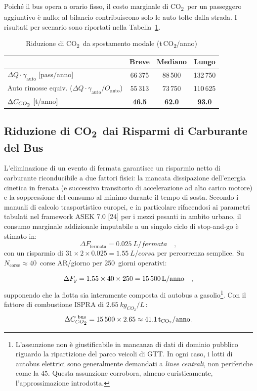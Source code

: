 \documentclass[conference]{IEEEtran}
\newcommand{\co}{CO\textsubscript{2}}
\begin{document}
Poiché il bus opera a orario fisso, il costo marginale di \co\
per un passeggero aggiuntivo è nullo; al bilancio contribuiscono
solo le auto tolte dalla strada. I risultati per scenario sono
riportati nella Tabella~\ref{tab:co2_shift}.

\begin{table}[htbp]
\caption{Riduzione di \co\ da spostamento modale (t\,\co/anno)}
\label{tab:co2_shift}
\centering
\renewcommand{\arraystretch}{1.15}
\begin{tabular}{@{}lccc@{}}
\toprule
 & Breve & Mediano & Lungo \\
\midrule
$\Delta Q \cdot \gamma_\text{auto}$ [pass/anno] & 66\,375 & 88\,500 & 132\,750 \\
Auto rimosse equiv. ($\Delta Q \cdot \gamma_\text{auto}/ O_{\text{auto}}$) & 55\,313 & 73\,750 & 110\,625 \\
$\Delta C_{\co}$ [t/anno] & \textbf{46.5} & \textbf{62.0} & \textbf{93.0} \\
\bottomrule
\end{tabular}
\end{table}

\subsection{Riduzione di \co\ dai Risparmi di Carburante del Bus}

L'eliminazione di un evento di fermata garantisce un risparmio netto di carburante riconducibile a due fattori fisici: la mancata dissipazione dell'energia cinetica in frenata (e successivo transitorio di accelerazione ad alto carico motore) e la soppressione del consumo al minimo durante il tempo di sosta.
Secondo i manuali di calcolo trasportistico europei, e in particolare rifacendosi ai parametri tabulati nel framework ASEK 7.0 [24] per i mezzi pesanti in ambito urbano, il consumo marginale addizionale imputabile a un singolo ciclo di stop-and-go è stimato in:
\begin{equation}
  \Delta F_\text{fermata} = \SI{0.025}{L/fermata}  \quad,
  \label{eq:fuel_stop}
\end{equation}
con un risparmio di $31 \times 2 \times 0.025 = \SI{1.55}{L/corsa}$
per percorrenza semplice. Su $N_\text{corse} \approx 40$~corse
AR/giorno per 250~giorni operativi:

\begin{equation}
  \Delta F_y = 1.55 \times 40 \times 250 = \SI{15\,500}{L/anno} \quad,
  \label{eq:fuel_annual}
\end{equation}
supponendo che la flotta sia interamente composta di autobus a gasolio\footnote{L'assunzione non è giustificabile in mancanza di dati di dominio pubblico riguardo la ripartizione del parco veicoli di GTT. In ogni caso, i lotti di autobus elettrici sono generalmente demandati a \emph{linee centrali}, non periferiche come la 45. Questa assunzione corrobora, almeno euristicamente, l'approssimazione introdotta.}. Con il fattore di combustione ISPRA di
$\SI{2.65}{kg_{CO_2}/L}$\,\cite{ispra2023}:
\begin{equation}
  \Delta C_{\co}^{\text{ bus}} = 15\,500 \times 2.65
  \approx \mathbf{\SI{41.1}{t_{CO_2}/anno}}.
  \label{eq:co2_bus}
\end{equation}
\end{document}
